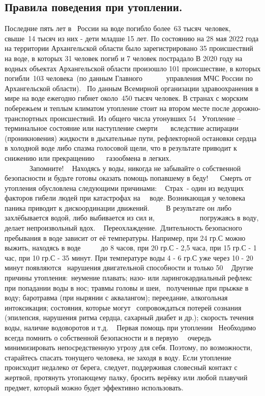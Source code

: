 \documentclass[a4paper, 12pt]{article}
\theoremstyle{definition}
\begin{document}
        \subsection{Правила поведения при утоплении.}

        Последние пять лет в  России на воде погибло более 63 тысяч человек,
        свыше 14 тысяч из них - дети младше 15 лет.
        По состоянию на 28 мая 2022 года на территории Архангельской области было зарегистрировано 35 происшествий на воде, в которых 31 человек погиб и 7 человек пострадало
        В 2020 году на водных объектах Архангельской области произошло 101 происшествие, в которых погибли 103 человека (по данным Главного       управления МЧС России по Архангельской области).
         По данным Всемирной организации здравоохранения в мире на воде ежегодно гибнет около 450 тысяч человек. В странах с морским побережьем и теплым климатом утопление стоит на втором месте после дорожно-транспортных происшествий. Из общего числа утонувших 54%
         Утопление – терминальное состояние или наступление смерти    вследствие аспирации (проникновения) жидкости в дыхательные пути, рефлекторной остановки сердца в холодной воде либо спазма голосовой щели, что в результате приводит к снижению или прекращению    газообмена в легких.
                                             Запомните!
         
        Находясь у воды, никогда не забывайте о собственной безопасности
        и будьте готовы оказать помощь попавшему в беду!
         
         Смерть от утопления обусловлена следующими причинами:
         
        Страх - один из ведущих факторов гибели людей при катастрофах на   воде. Возникающая у человека паника приводит к дискоординации движений.     В результате он либо захлёбывается водой, либо выбивается из сил и,             погружаясь в воду, делает непроизвольный вдох.
         
        Переохлаждение. Длительность безопасного пребывания в воде зависит от её температуры. Например, при 24 гр.С можно выжить, находясь в воде      до 8 часов, при 20 гр.С - 2,5 часа, при 15 гр.С - 1 час, при 10 гр.С - 35 минут. При температуре воды 4 - 6 гр.С уже через 10 - 20 минут появляются  нарушения двигательной способности и только 50%
         
        Другие причины утопления: неумение плавать; назо- или ларингокардиальный рефлекс при попадании воды в нос; травмы головы и шеи,  полученные при прыжке в воду; баротравма (при нырянии с аквалангом); переедание, алкогольная интоксикация; состояния, которые могут  сопровождаться потерей сознания (эпилепсия, нарушения ритма сердца, сахарный диабет и др.); скорость течения воды, наличие водоворотов и т.д.
         
        Первая помощь при утоплении
         Необходимо всегда помнить о собственной безопасности и в первую   очередь минимизировать непосредственную угрозу для себя. Поэтому, по возможности, старайтесь спасать тонущего человека, не заходя в воду.
        Если утопление происходит недалеко от берега, следует, поддерживая словесный контакт с жертвой, протянуть утопающему палку, бросить верёвку или любой плавучий предмет, который можно будет эффективно использовать.
         
        
\end{document}
